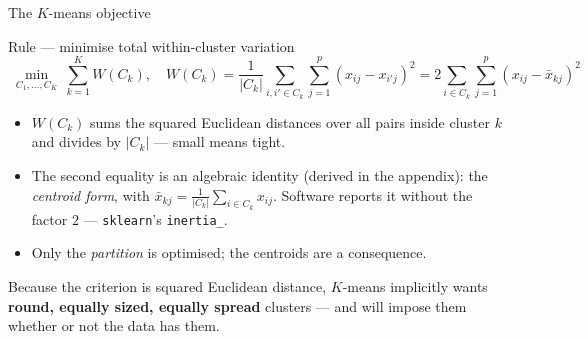 \documentclass[aspectratio=169,11pt]{beamer}
\begin{document}
\begin{frame}{The $K$-means objective}
  \scriptsize
  \begin{block}{Rule --- minimise total within-cluster variation}
    \[
      \boxed{\;\min_{C_1,\dots,C_K}\ \sum_{k=1}^{K} W(C_k),
      \quad W(C_k)=\frac{1}{|C_k|}\sum_{i,i'\in C_k}\sum_{j=1}^{p}(x_{ij}-x_{i'j})^{2}
      = 2\sum_{i\in C_k}\sum_{j=1}^{p}(x_{ij}-\bar x_{kj})^{2} \;}
    \]
  \end{block}
  \begin{readme}
    \begin{itemize}
      \item $W(C_k)$ sums the squared Euclidean distances over all pairs inside
            cluster $k$ and divides by $|C_k|$ --- small means tight.
      \item The second equality is an algebraic identity (derived in the appendix): the
            \emph{centroid form}, with $\bar x_{kj}=\frac{1}{|C_k|}\sum_{i\in C_k}x_{ij}$.
            Software reports it without the factor $2$ --- \texttt{sklearn}'s
            \texttt{inertia\_}.
      \item Only the \emph{partition} is optimised; the centroids are a consequence.
    \end{itemize}
  \end{readme}
  \begin{takeaway}
    Because the criterion is squared Euclidean distance, $K$-means implicitly wants
    \textbf{round, equally sized, equally spread} clusters --- and will impose them
    whether or not the data has them.
  \end{takeaway}
\end{frame}
\end{document}
